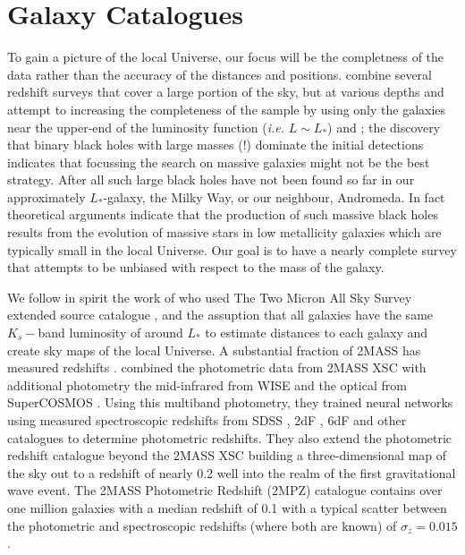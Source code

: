 \documentclass[useAMS,usenatbib]{mn2e}
\begin{document}
\section{Galaxy Catalogues}

To gain a picture of the local Universe, our focus will be the
completness of the data rather than the accuracy of the distances and
positions.  \citet{2015arXiv150803608G} combine several redshift
surveys
\citep[e.g.][]{2002MNRAS.336..907N,2003MNRAS.344..307L,2005MNRAS.360...81D,
  2012ApJS..199...26H}
that cover a large portion of the sky, but at various depths and
attempt to increasing the completeness of the sample by using only the
galaxies near the upper-end of the luminosity function ({\em i.e.}
$L\sim L_*$) and ; the discovery that binary black holes with large
masses (!)  dominate the initial detections indicates that focussing
the search on massive galaxies might not be the best strategy.  After
all such large black holes have not been found so far in our
approximately $L_*$-galaxy, the Milky Way, or our neighbour,
Andromeda.  In fact theoretical arguments indicate that the production
of such massive black holes results from the evolution of massive
stars in low metallicity galaxies which are typically small in the
local Universe. Our goal is to have a nearly complete survey that
attempts to be unbiased with respect to the mass of the galaxy.

We follow in spirit the work of \citet{2004PASA...21..396J} who used
The Two Micron All Sky Survey extended source catalogue \citep[2MASS
  XSC,][]{2000AJ....119.2498J,2006AJ....131.1163S}, and the assuption
that all galaxies have the same $K_s-$band luminosity of around $L_*$
to estimate distances to each galaxy and create sky maps of the local
Universe.  A substantial fraction of 2MASS has measured redshifts
\citep[e.g][]{2012ApJS..199...26H}.  \citet{2014ApJS..210....9B}
combined the photometric data from 2MASS XSC with additional
photometry the mid-infrared from WISE \citep{2010AJ....140.1868W} and
the optical from SuperCOSMOS
\citep{2001MNRAS.326.1315H,2001MNRAS.326.1295H,2001MNRAS.326.1279H}.
Using this multiband photometry, they trained neural networks using
measured spectroscopic redshifts from SDSS
\citep{2012ApJS..203...21A,2014ApJS..211...17A}, 2dF
\citep{2001MNRAS.328.1039C,2003astro.ph..6581C}, 6dF
\citep{2004MNRAS.355..747J,2009MNRAS.399..683J} and other catalogues
to determine photometric redshifts.  They also extend the photometric
redshift catalogue beyond the 2MASS XSC building a three-dimensional
map of the sky out to a redshift of nearly 0.2 well into the realm of
the first gravitational wave event.  The 2MASS Photometric Redshift
(2MPZ) catalogue contains over one million galaxies with a median
redshift of 0.1 with a typical scatter between the
photometric and spectroscopic redshifts (where both are known) of
$\sigma_z = 0.015$.
\end{document}
